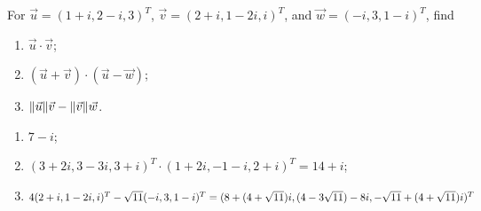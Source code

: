 \begin{Exercise}
For $\vec{u} = (1+i, 2-i, 3)^T$, $\vec{v} = (2+i, 1-2i, i)^T$, and $\vec{w} = (-i, 3, 1-i)^T$, find
\begin{enumerate}[label=(\alph*)]
\item $\vec{u} \cdot \vec{v}$;
\item $(\vec{u} + \vec{v}) \cdot (\vec{u} - \vec{w})$;
\item $\norm{\vec{u}} \vec{v} - \norm{\vec{v}} \vec{w}$.
\end{enumerate}
\end{Exercise}
\begin{Answer}
\begin{enumerate}[label=(\alph*)]
\item $7-i$;
\item $(3+2i, 3-3i, 3+i)^T \cdot (1+2i,-1-i,2+i)^T = 14+i$;
\item $4(2+i, 1-2i, i)^T - \sqrt{11}(-i, 3, 1-i)^T \\
= (8+(4+\sqrt{11})i, (4-3\sqrt{11})-8i, -\sqrt{11}+(4+\sqrt{11})i)^T $
\end{enumerate}
\end{Answer}


